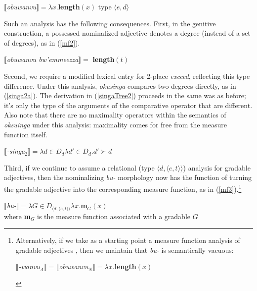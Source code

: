 \documentclass[output=paper,
modfonts
]{langscibook}
\begin{document}
\begin{exe}
\ex\label{mf1}
$\llbracket${\it obuwanvu}$\rrbracket = \lambda x.${\bf length}$(x)$ \hfill type $\langle e, d\rangle$
\end{exe}


Such an analysis has the following consequences. First, in the genitive construction, a possessed nominalized adjective denotes a degree (instead of a set of degrees), as in (\ref{mf2}).



\begin{exe}
\ex\label{mf2}
$\llbracket${\it obuwanvu bw'emmeezza}$\rrbracket = $ {\bf length}$(t)$
\end{exe}


Second, we require a modified lexical entry for 2-place {\it exceed}, reflecting this type difference.  Under this analysis, {\it okusinga} compares two degrees directly, as in (\ref{singa2a}). The derivation in (\ref{singaTree2}) proceeds in the same was as before; it's only the type of the arguments of the comparative operator that are different. Also note that there are no maximality operators within the semantics of {\it oksuinga} under this analysis: maximality comes for free from the measure function itself.


\begin{exe}
\ex\label{singa2a}
 $\llbracket${\it -singa}$_2\rrbracket = \lambda d \in D_d\lambda d' \in D_d.d' \succ d$
\end{exe}


Third, if we continue to assume a relational (type $\langle d, \langle e, t\rangle\rangle$) analysis for gradable adjectives, then the nominalizing {\it bu-} morphology now has the function of turning the gradable adjective into the corresponding measure function, as in (\ref{mf3}).\footnote{Alternatively, if we take as a starting point a measure function analysis of gradable adjectives \citep{bartsch72grammar, kennedy07vagueness}, then we maintain that {\it bu-} is semantically vacuous:

\begin{exe}
\ex
$\llbracket${\it -wanvu}$_A\rrbracket = \llbracket${\it obuwanvu}$_N\rrbracket = \lambda x.${\bf length}$(x)$
\end{exe}
}



\begin{exe}
\ex\label{mf3}
$\llbracket${\it bu-}$\rrbracket = \lambda G \in D_{\langle d, \langle e, t\rangle\rangle}\lambda x.${\bf m}$_G(x)$ \\
where {\bf m}$_G$ is the measure function associated with a gradable  $G$
\end{exe}
\end{document}
